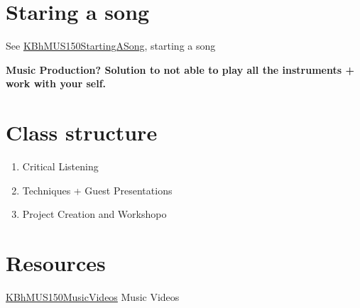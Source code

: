 \documentclass[letterpaper]{article}
\begin{document}
\section{Staring a song}
\label{sec:org4437c2b}
See \href{KBhMUS150StartingASong.org}{KBhMUS150StartingASong},
starting a song

\textbf{Music Production? Solution to not able to play all the instruments +
work with your self.}

\section{Class structure}
\label{sec:org65f841d}
\begin{enumerate}
\item Critical Listening
\item Techniques + Guest Presentations
\item Project Creation and Workshopo
\end{enumerate}

\section{Resources}
\label{sec:org0ddfb20}
\href{KBhMUS150MusicVideos.org}{KBhMUS150MusicVideos} Music Videos
\end{document}
